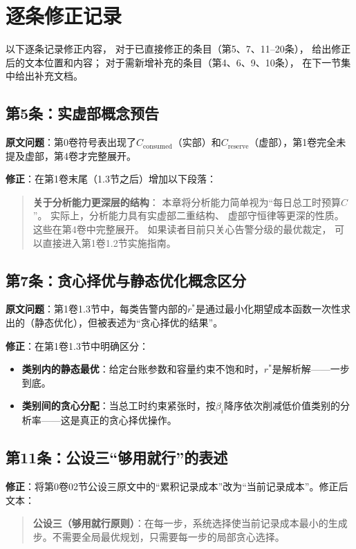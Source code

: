 \documentclass[11pt,a4paper]{article}
\begin{document}
\section{逐条修正记录}

以下逐条记录修正内容，
对于已直接修正的条目（第5、7、11--20条），
给出修正后的文本位置和内容；
对于需新增补充的条目（第4、6、9、10条），
在下一节集中给出补充文档。

\subsection{第5条：实虚部概念预告}

\textbf{原文问题}：第0卷符号表出现了$C_{\text{consumed}}$（实部）和$C_{\text{reserve}}$（虚部），第1卷完全未提及虚部，第4卷才完整展开。

\textbf{修正}：在第1卷末尾（1.3节之后）增加以下段落：
\begin{quote}
\textbf{关于分析能力更深层的结构}：
本章将分析能力简单视为“每日总工时预算$C$”。
实际上，分析能力具有实虚部二重结构、
虚部守恒律等更深的性质。
这些在第4卷中完整展开。
如果读者目前只关心告警分级的最优裁定，
可以直接进入第1卷1.2节实施指南。
\end{quote}

\subsection{第7条：贪心择优与静态优化概念区分}

\textbf{原文问题}：第1卷1.3节中，每类告警内部的$r^*$是通过最小化期望成本函数一次性求出的（静态优化），但被表述为“贪心择优的结果”。

\textbf{修正}：在第1卷1.3节中明确区分：
\begin{itemize}
    \item \textbf{类别内的静态最优}：给定台账参数和容量约束不饱和时，$r^*$是解析解——一步到底。
    \item \textbf{类别间的贪心分配}：当总工时约束紧张时，按$\beta_i$降序依次削减低价值类别的分析率——这是真正的贪心择优操作。
\end{itemize}

\subsection{第11条：公设三“够用就行”的表述}

\textbf{修正}：将第0卷02节公设三原文中的“累积记录成本”改为“当前记录成本”。修正后文本：
\begin{quote}
\textbf{公设三（够用就行原则）}：在每一步，系统选择使当前记录成本最小的生成步。不需要全局最优规划，只需要每一步的局部贪心选择。
\end{quote}
\end{document}
